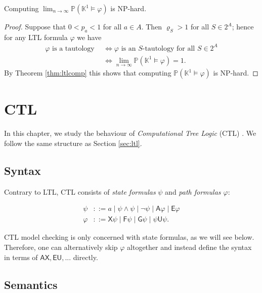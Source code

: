 \documentclass[runngingheads]{llncs}
\begin{document}
\begin{corollary}
Computing $\lim_{n\rightarrow \infty} \mathbb{P}(\mathbb{K}^1 \models \varphi)$ is NP-hard.
\end{corollary}

\begin{proof}
Suppose that $0 < p_a < 1$ for all $a \in A$. Then $\varrho_S > 1$ for all $S \in 2^A$; hence for any LTL formula $\varphi$ we have
\begin{align*}
\varphi \textrm{ is a tautology} \ \  &\Leftrightarrow \varphi \textrm{ is an $S$-tautology for all $S \in 2^A$}\\
&\Leftrightarrow \lim_{n \rightarrow \infty} \mathbb{P}(\mathbb{K}^1 \models \varphi) = 1.
\end{align*}
By Theorem \ref{thm:ltlcomp} this shows that computing $\mathbb{P}(\mathbb{K}^1 \models \varphi)$ is NP-hard.
\end{proof}

\section{CTL} \label{sec:ctl}

In this chapter, we study the behaviour of \emph{Computational Tree Logic} (CTL) \cite{baier2008principles}. We follow the same structure as Section \ref{sec:ltl}.

\subsection{Syntax}

Contrary to LTL, CTL consists of \emph{state formulas} $\psi$ and \emph{path formulas $\varphi$}:

\begin{align*}
\psi &::= a \mid \psi \wedge \psi \mid \neg \psi \mid \mathsf{A}\varphi \mid \mathsf{E}\varphi \\
\varphi &::= \mathsf{X}\psi \mid \mathsf{F}\psi \mid \mathsf{G}\psi \mid \psi \mathsf{U}\psi.
\end{align*}

CTL model checking is only concerned with state formulas, as we will see below. Therefore, one can alternatively skip $\varphi$ altogether and instead define the syntax in terms of $\mathsf{AX}, \mathsf{EU},...$ directly.

\subsection{Semantics}
\end{document}
